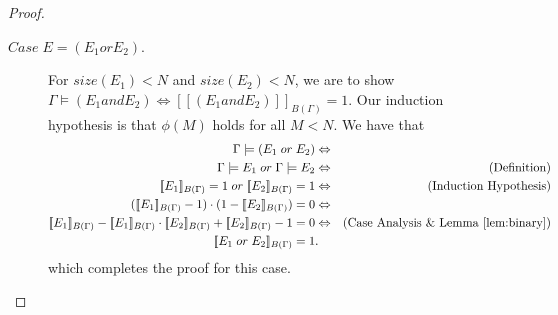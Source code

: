 \documentclass[acmsmall,nonacm]{acmart}\settopmatter{printfolios=true,printccs=false,printacmref=false}
\newcommand{\qqpi}[2]{[\![#2]\!]_{#1}}
\begin{document}
\begin{proof}
\begin{description}
            \item[$Case \; E = (E_1 \mathrel{or} E_2)$.]
                  For $size(E_1) < N$ and $size(E_2) < N$, we are to show
                  $\Gamma \models (E_1 \mathrel{and} E_2) \Leftrightarrow \qqpi{B(\Gamma)}{(E_1 \mathrel{and} E_2)} = 1$. Our induction hypothesis is that $\phi(M)$ holds for all $M<N$. We have that
                  \begin{align*}
                      \Gamma \models (E_1 \mathrel{or} E_2)                                                                     & \Leftrightarrow & \\
                      \Gamma \models E_1 \mathrel{or} \Gamma \models E_2                                                        & \Leftrightarrow &\text{(Definition)} \\
                      \qqpi{B(\Gamma)}{E_1} = 1 \mathrel{or} \qqpi{B(\Gamma)}{E_2} = 1                                          & \Leftrightarrow & \text{(Induction Hypothesis)}                                  \\
                      (\qqpi{B(\Gamma)}{E_1} - 1) \cdot (1- \qqpi{B(\Gamma)}{E_2}) = 0                                          & \Leftrightarrow                                  \\
                      \qqpi{B(\Gamma)}{E_1} - \qqpi{B(\Gamma)}{E_1} \cdot \qqpi{B(\Gamma)}{E_2} + \qqpi{B(\Gamma)}{E_2} - 1 = 0 & \Leftrightarrow                         &\text{(Case Analysis \& Lemma~\ref{lem:binary})}         \\
                      \qqpi{B(\Gamma)}{E_1 \mathrel{or} E_2} = 1                                                               &. 
                  \end{align*}
                  which completes the proof for this case.
    \end{description}
\end{proof}




\end{document}
